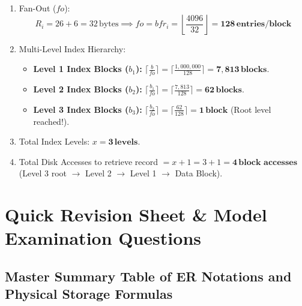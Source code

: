 \documentclass[11pt,a4paper]{article}
\newenvironment{Solution}[1][Step-by-Step Solution]{\begin{tcolorbox}[solbox, title=#1]}{\end{tcolorbox}}
\begin{document}
\begin{Solution}
\begin{enumerate}
  \item Fan-Out ($fo$):
    \begin{equation*}
      R_i = 26 + 6 = 32\,\text{bytes} \implies fo = bfr_i = \left\lfloor \frac{4096}{32} \right\rfloor = \mathbf{128\,\text{entries/block}}
    \end{equation*}
  \item Multi-Level Index Hierarchy:
    \begin{itemize}
      \item \textbf{Level 1 Index Blocks ($b_1$):} $\lceil \frac{b}{fo} \rceil = \lceil \frac{1,000,000}{128} \rceil = \mathbf{7,813\,\text{blocks}}$.
      \item \textbf{Level 2 Index Blocks ($b_2$):} $\lceil \frac{b_1}{fo} \rceil = \lceil \frac{7,813}{128} \rceil = \mathbf{62\,\text{blocks}}$.
      \item \textbf{Level 3 Index Blocks ($b_3$):} $\lceil \frac{b_2}{fo} \rceil = \lceil \frac{62}{128} \rceil = \mathbf{1\,\text{block}}$ (Root level reached!).
    \end{itemize}
  \item Total Index Levels: $x = \mathbf{3\,\text{levels}}$.
  \item Total Disk Accesses to retrieve record $= x + 1 = 3 + 1 = \mathbf{4\,\text{block accesses}}$ (Level 3 root $\to$ Level 2 $\to$ Level 1 $\to$ Data Block).
\end{enumerate}
\end{Solution}

\clearpage
\section{Quick Revision Sheet \& Model Examination Questions}

\subsection{Master Summary Table of ER Notations and Physical Storage Formulas}
\end{document}
